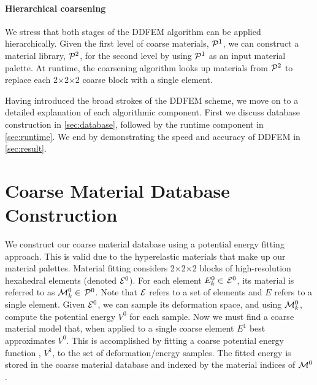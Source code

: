 \paragraph{Hierarchical coarsening}
We stress that both stages of the DDFEM algorithm can be applied hierarchically. Given the first level of coarse materials, $\mathcal{P}^1$, we can construct a material library, $\mathcal{P}^2$, for the second level by using $\mathcal{P}^1$ as an input material palette. At runtime, the coarsening algorithm looks up materials from $\mathcal{P}^2$ to replace each 2$\times$2$\times$2 coarse block with a single element.

Having introduced the broad strokes of the DDFEM scheme, we move on to a detailed explanation of each algorithmic component. First we discuss database construction in \autoref{sec:database}, followed by the runtime component in \autoref{sec:runtime}. We end by demonstrating the speed and accuracy of DDFEM in \autoref{sec:result}.

\section{Coarse Material Database Construction}
\label{sec:database}
We construct our coarse material database using a potential energy fitting approach.
This is valid due to the hyperelastic materials that make up our material palettes.
Material fitting considers 2$\times$2$\times$2 blocks of high-resolution hexahedral elements (denoted $\mathcal{E}^0$).
For each element $E_k^0\in \, \mathcal{E}^0$, its material is referred to as $\mathcal{M}_k^0\in \, \mathcal{P}^0$. 
Note that $\mathcal{E}$ refers to a set of elements and $E$ refers to a single element.
Given $\mathcal{E}^0$, we can sample its deformation space, and using $\mathcal{M}_k^0$, compute the potential energy $V^0$ for each sample.
Now we must find a coarse material model that, when applied to a single coarse element $\mathit{E}^1$ best approximates $V^0$.
This is accomplished by fitting a coarse potential energy function , $V^1$, to the set of deformation/energy samples.
The fitted energy is stored in the coarse material database and indexed by the material indices of $\mathcal{M}^0$.

